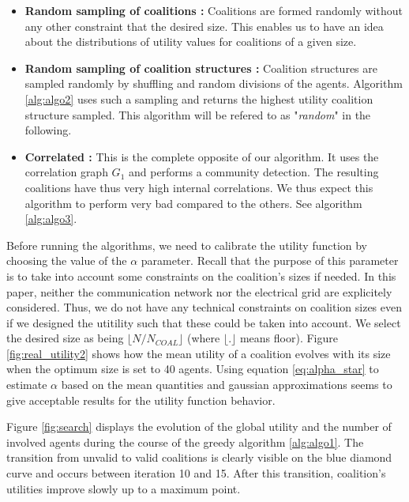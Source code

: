 \documentclass[conference]{IEEEtran}
\begin{document}
\begin{itemize}
\item \textbf{Random sampling of coalitions :} Coalitions are formed randomly without any other constraint that the desired size. This enables us to have an idea about the distributions of utility values for coalitions of a given size.
\item \textbf{Random sampling of coalition structures :} Coalition structures are sampled randomly by shuffling and random divisions of the agents. Algorithm \ref{alg:algo2} uses such a sampling and returns the highest utility coalition structure sampled. This algorithm will be refered to as "\textit{random}" in the following.
\item \textbf{Correlated :} This is the complete opposite of our algorithm. It uses the correlation graph $ G_{1} $ and performs a community detection. The resulting coalitions have thus very high internal correlations. We thus expect this algorithm to perform very bad compared to the others. See algorithm \ref{alg:algo3}.
\end{itemize} 


Before running the algorithms, we need to calibrate the utility function by choosing the value of the $ \alpha $ parameter. Recall that the purpose of this parameter is to take into account some constraints on the coalition's sizes if needed. In this paper, neither the communication network nor the electrical grid are explicitely considered. Thus, we do not have any technical constraints on coalition sizes even if we designed the utitility such that these could be taken into account. We select the desired size as being $ \lfloor N/N_{COAL} \rfloor $ (where $ \lfloor.\rfloor $ means floor). Figure \ref{fig:real_utility2} shows how the mean utility of a coalition evolves with its size when the optimum size is set to 40 agents. Using equation \ref{eq:alpha_star} to estimate $ \alpha $ based on the mean quantities and gaussian approximations seems to give acceptable results for the utility function behavior.

Figure \ref{fig:search} displays the evolution of the global utility and the number of involved agents during the course of the greedy algorithm \ref{alg:algo1}. The transition from unvalid to valid coalitions is clearly visible on the blue diamond curve and occurs between iteration 10 and 15. After this transition, coalition's utilities improve slowly up to a maximum point. 
\end{document}
